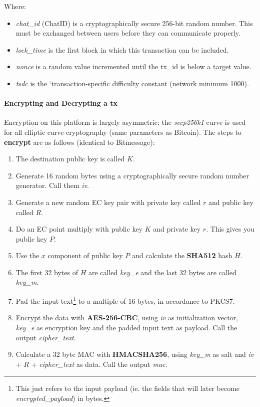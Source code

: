 \documentclass{article}
\begin{document}
Where:
\begin{itemize}
    \item \textit{chat\_id} (ChatID) is a cryptographically secure 256-bit random number. This must be exchanged between users before they can communicate properly.
    \item \textit{lock\_time} is the first block in which this transaction can be included.
    \item \textit{nonce} is a random value incremented until the tx\_id is below a target value.
    \item \textit{tsdc} is the `transaction-specific difficulty constant (network minimum 1000).
\end{itemize}

\vspace{0.5cm}

\paragraph{Encrypting and Decrypting a tx}
Encryption on this platform is largely asymmetric; the \textit{secp256k1} curve is used for all elliptic curve cryptography (same parameters as Bitcoin).
The steps to \textbf{encrypt} are as follows (identical to Bitmessage):
\begin{enumerate}
    \item The destination public key is called $K$.
    \item Generate 16 random bytes using a cryptographically secure random number generator. Call them \textit{iv}.
    \item Generate a new random EC key pair with private key called $r$ and public key called $R$.
    \item Do an EC point multiply with public key $K$ and private key $r$. This gives you public key $P$.
    \item Use the $x$ component of public key $P$ and calculate the \textbf{SHA512} hash $H$.
    \item The first 32 bytes of $H$ are called \textit{key\_e} and the last 32 bytes are called \textit{key\_m}.
    \item Pad the input text\footnote{This just refers to the input payload (ie. the fields that will later become \textit{encrypted\_payload}) in bytes.} to a multiple of 16 bytes, in accordance to PKCS7.
    \item Encrypt the data with \textbf{AES-256-CBC}, using \textit{iv} as initialization vector, \textit{key\_e} as encryption key and the padded input text as payload. Call the output \textit{cipher\_text}.
    \item Calculate a 32 byte MAC with \textbf{HMACSHA256}, using \textit{key\_m} as salt and \textit{iv} + $R$ + \textit{cipher\_text} as data. Call the output \textit{mac}.
\end{enumerate}
\end{document}
